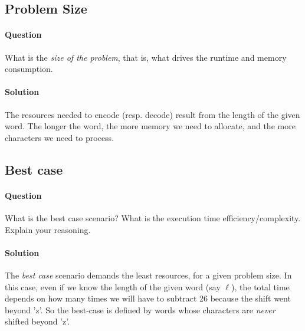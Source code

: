 \documentclass{article}
\begin{document}
\subsection{Problem Size}
\paragraph{Question} What is the \emph{size of the problem}, that is,
what drives the runtime and memory consumption.

\paragraph{Solution} The resources needed to encode (resp. decode)
result from the length of the given word. The longer the word, the
more memory we need to allocate, and the more characters we need to
process.

\subsection{Best case}
\paragraph{Question} What is the best case scenario? What is the execution
time efficiency/complexity. Explain your reasoning.

\paragraph{Solution} The \emph{best case} scenario demands the least
resources, for a given problem size. In this case, even if we know the
length of the given word (say $\ell$), the total time depends on how
many times we will have to subtract 26 because the shift went beyond
'z'. So the best-case is defined by words whose characters are
\emph{never} shifted beyond 'z'.
\end{document}
